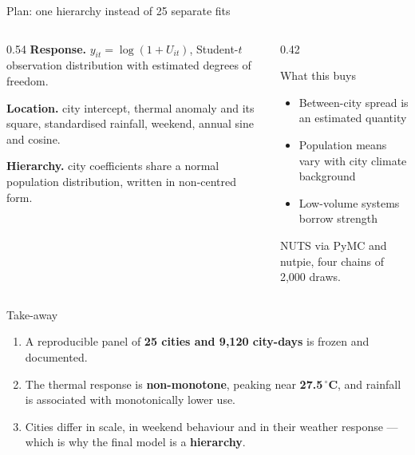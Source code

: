 \documentclass[aspectratio=169,11pt]{beamer}
\newcommand{\hl}[1]{{\color{csPurple}\bfseries #1}}
\newcommand{\hlg}[1]{{\color{csGold}\bfseries #1}}
\begin{document}
\begin{frame}{Plan: one hierarchy instead of 25 separate fits}
  \small
  \begin{columns}[T,onlytextwidth]
    \begin{column}{0.54\textwidth}
      \textbf{Response.} $y_{it}=\log(1+U_{it})$, Student-$t$ observation
      distribution with estimated degrees of freedom.

      \vspace{0.24cm}
      \textbf{Location.} city intercept, thermal anomaly and its square,
      standardised rainfall, weekend, annual sine and cosine.

      \vspace{0.24cm}
      \textbf{Hierarchy.} city coefficients share a normal population
      distribution, written in non-centred form.
    \end{column}
    \begin{column}{0.42\textwidth}
      \begin{block}{What this buys}
        \begin{itemize}
          \item Between-city spread is an estimated quantity
          \item Population means vary with city climate background
          \item Low-volume systems borrow strength
        \end{itemize}
      \end{block}
      \vspace{0.18cm}
      \footnotesize NUTS via PyMC and nutpie, four chains of 2{,}000 draws.
    \end{column}
  \end{columns}
\end{frame}

\begin{frame}{Take-away}
  \vspace{0.24cm}
  \begin{enumerate}
    \setlength{\itemsep}{0.52cm}
    \item A reproducible panel of \hl{25 cities and 9{,}120 city-days} is frozen
      and documented.
    \item The thermal response is \hl{non-monotone}, peaking near
      \hlg{27.5\,$^\circ$C}, and rainfall is associated with monotonically lower use.
    \item Cities differ in scale, in weekend behaviour and in their weather
      response --- which is why the final model is a \hl{hierarchy}.
  \end{enumerate}
  \vspace{0.60cm}
  \centering \hl{Questions}
\end{frame}
\end{document}
